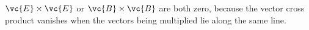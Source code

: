 $\vc{E}\times\vc{E}$ or $\vc{B}\times\vc{B}$ are both zero, because
the vector cross product vanishes when the vectors being multiplied
lie along the same line.
